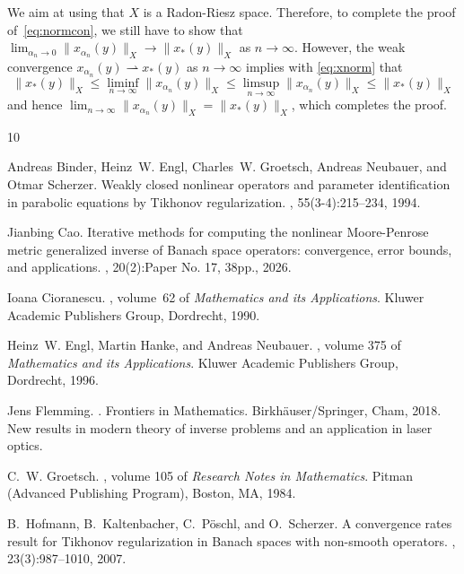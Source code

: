 \documentclass[12pt]{amsart}
\theoremstyle{remark}
\begin{document}
We aim at using that $X$ is a Radon-Riesz space.
Therefore, to complete the proof of~\eqref{eq:normcon}, we still have to show that $\lim_{\alpha_n \to 0} \|x_{\alpha_n}(y)\|_X \to \|x_*(y)\|_X$ as $n \to \infty$. However, the weak convergence $x_{\alpha_n}(y) \rightharpoonup x_*(y)$ as $ n\to \infty$ implies with \eqref{eq:xnorm} that 
$$\|x_*(y)\|_X \le \liminf_{n \to \infty} \|x_{\alpha_n}(y)\|_X \le  \limsup_{n \to \infty} \|x_{\alpha_n}(y)\|_X \le \|x_*(y)\|_X $$
and hence $\lim_{n \to \infty} \|x_{\alpha_n}(y)\|_X=\|x_*(y)\|_X$, which completes the proof.
\begin{thebibliography}{10}

Andreas Binder, Heinz~W. Engl, Charles~W. Groetsch, Andreas Neubauer, and Otmar
  Scherzer.
\newblock Weakly closed nonlinear operators and parameter identification in
  parabolic equations by {T}ikhonov regularization.
, 55(3-4):215--234, 1994.

Jianbing Cao.
\newblock Iterative methods for computing the nonlinear {M}oore-{P}enrose
  metric generalized inverse of {B}anach space operators: convergence, error
  bounds, and applications.
, 20(2):Paper No. 17, 38pp., 2026.

Ioana Cioranescu.
, volume~62 of {\em Mathematics and its Applications}.
\newblock Kluwer Academic Publishers Group, Dordrecht, 1990.

Heinz~W. Engl, Martin Hanke, and Andreas Neubauer.
, volume 375 of {\em
  Mathematics and its Applications}.
\newblock Kluwer Academic Publishers Group, Dordrecht, 1996.

Jens Flemming.
.
\newblock Frontiers in Mathematics. Birkh\"auser/Springer, Cham, 2018.
\newblock New results in modern theory of inverse problems and an application
  in laser optics.

C.~W. Groetsch.
, volume 105 of {\em Research Notes in Mathematics}.
\newblock Pitman (Advanced Publishing Program), Boston, MA, 1984.

B.~Hofmann, B.~Kaltenbacher, C.~P\"{o}schl, and O.~Scherzer.
\newblock A convergence rates result for {T}ikhonov regularization in {B}anach
  spaces with non-smooth operators.
, 23(3):987--1010, 2007.


\end{thebibliography}
\end{document}
